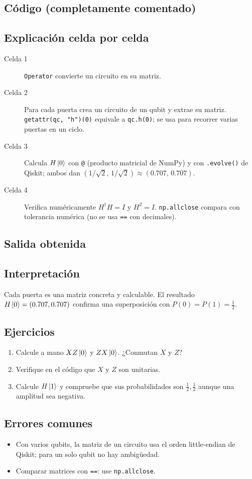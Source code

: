 \subsection{Código (completamente comentado)}


\subsection{Explicación celda por celda}
\begin{description}
  \item[Celda 1] \texttt{Operator} convierte un circuito en su matriz.
  \item[Celda 2] Para cada puerta crea un circuito de un qubit y extrae su
    matriz. \texttt{getattr(qc, "h")(0)} equivale a \texttt{qc.h(0)}; se usa
    para recorrer varias puertas en un ciclo.
  \item[Celda 3] Calcula $H\left|0\right\rangle$ con \texttt{@} (producto matricial de
    NumPy) y con \texttt{.evolve()} de Qiskit; ambos dan
    $(1/\sqrt2,\,1/\sqrt2)\approx(0.707,\,0.707)$.
  \item[Celda 4] Verifica numéricamente $H^\dagger H=I$ y $H^2=I$.
    \texttt{np.allclose} compara con tolerancia numérica (no se usa
    \texttt{==} con decimales).
\end{description}

\subsection{Salida obtenida}


\subsection{Interpretación}
Cada puerta es una matriz concreta y calculable. El resultado
$H\left|0\right\rangle=(0.707,0.707)$ confirma una superposición con
$P(0)=P(1)=\tfrac12$.

\subsection{Ejercicios}
\begin{enumerate}
  \item Calcule a mano $XZ\left|0\right\rangle$ y $ZX\left|0\right\rangle$. ¿Conmutan $X$ y $Z$?
  \item Verifique en el código que $X$ y $Z$ son unitarias.
  \item Calcule $H\left|1\right\rangle$ y compruebe que sus probabilidades son $\tfrac12,\tfrac12$
    aunque una amplitud sea negativa.
\end{enumerate}

\subsection{Errores comunes}
\begin{itemize}
  \item Con varios qubits, la matriz de un circuito usa el orden
    little-endian de Qiskit; para un solo qubit no hay ambigüedad.
  \item Comparar matrices con \texttt{==}: use \texttt{np.allclose}.
\end{itemize}


